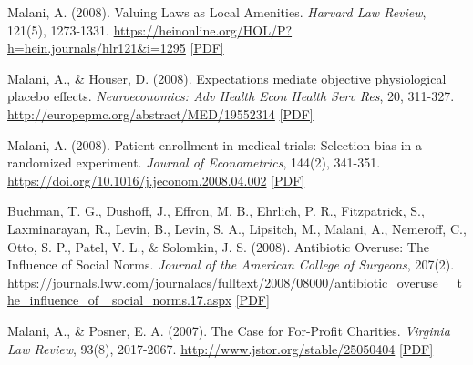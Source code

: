 \begin{tablist}
        \item[2008] \tab{}Malani, A. (2008). Valuing Laws as Local Amenities. \textit{Harvard Law Review}, 121(5), 1273-1331. \href{https://heinonline.org/HOL/P?h=hein.journals/hlr121&i=1295}{https://heinonline.org/HOL/P?h=hein.journals/hlr121\&i=1295}  \href{https://github.com/anup-malani/website_personal/blob/main/publications/2008_Malani_HarvLRev_LawAsLocalAmenity.pdf}{[PDF]} 
    
        \item[2008] \tab{}Malani, A., \& Houser, D. (2008). Expectations mediate objective physiological placebo effects. \textit{Neuroeconomics: Adv Health Econ Health Serv Res}, 20, 311-327. \href{http://europepmc.org/abstract/MED/19552314}{http://europepmc.org/abstract/MED/19552314}  \href{https://github.com/anup-malani/website_personal/blob/main/publications/2008_Malani_Neuroecon_CaffeinePlacebo.pdf}{[PDF]} 

        \item[2008] \tab{}Malani, A. (2008). Patient enrollment in medical trials: Selection bias in a randomized experiment. \textit{Journal of Econometrics}, 144(2), 341-351. \href{https://doi.org/10.1016/j.jeconom.2008.04.002}{https://doi.org/10.1016/j.jeconom.2008.04.002}  \href{https://github.com/anup-malani/website_personal/blob/main/publications/2008_Malani_JMetrics_PatientEnrollment.pdf}{[PDF]} 
    
        \item[2008] \tab{}Buchman, T. G., Dushoff, J., Effron, M. B., Ehrlich, P. R., Fitzpatrick, S., Laxminarayan, R., Levin, B., Levin, S. A., Lipsitch, M., Malani, A., Nemeroff, C., Otto, S. P., Patel, V. L., \& Solomkin, J. S. (2008). Antibiotic Overuse: The Influence of Social Norms. \textit{Journal of the American College of Surgeons}, 207(2). \href{https://journals.lww.com/journalacs/fulltext/2008/08000/antibiotic_overuse__the_influence_of_social_norms.17.aspx}{https://journals.lww.com/journalacs/fulltext/2008/08000/antibiotic\_overuse\_\_the\_influence\_of\_ social\_norms.17.aspx}   \href{https://github.com/anup-malani/website_personal/blob/main/publications/2008_BuchmanMalani_AbxOveruse.pdf}{[PDF]} 

        \item[2007] \tab{}Malani, A., \& Posner, E. A. (2007). The Case for For-Profit Charities. \textit{Virginia Law Review}, 93(8), 2017-2067. \href{http://www.jstor.org/stable/25050404}{http://www.jstor.org/stable/25050404} \href{https://github.com/anup-malani/website_personal/blob/main/publications/2007_Malani_CaseForForProfitCharities.pdf}{[PDF]}


\end{tablist}
